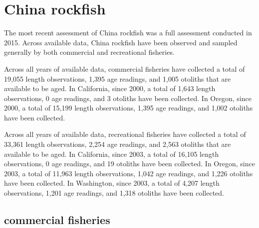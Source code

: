 \documentclass[11pt,
  english,
  letterpaper,
]{article}
\begin{document}

\hypertarget{china-rockfish}{%
\section{China rockfish}\label{china-rockfish}}

\leavevmode\tagmcend\tagstructend


The most recent assessment of China rockfish was a full assessment conducted in 2015. Across available data, China rockfish have been observed and sampled generally by both commercial and recreational fisheries.

\leavevmode\tagmcend\tagstructend\par


Across all years of available data, commercial fisheries have collected a total of 19,055 length observations, 1,395 age readings, and 1,005 otoliths that are available to be aged. In California, since 2000, a total of 1,643 length observations, 0 age readings, and 3 otoliths have been collected. In Oregon, since 2000, a total of 15,199 length observations, 1,395 age readings, and 1,002 otoliths have been collected.

\leavevmode\tagmcend\tagstructend\par


Across all years of available data, recreational fisheries have collected a total of 33,361 length observations, 2,254 age readings, and 2,563 otoliths that are available to be aged. In California, since 2003, a total of 16,105 length observations, 0 age readings, and 19 otoliths have been collected. In Oregon, since 2003, a total of 11,963 length observations, 1,042 age readings, and 1,226 otoliths have been collected. In Washington, since 2003, a total of 4,207 length observations, 1,201 age readings, and 1,318 otoliths have been collected.

\leavevmode\tagmcend\tagstructend\par


\hypertarget{commercial-fisheries-13}{%
\subsection{commercial fisheries}\label{commercial-fisheries-13}}
\end{document}
